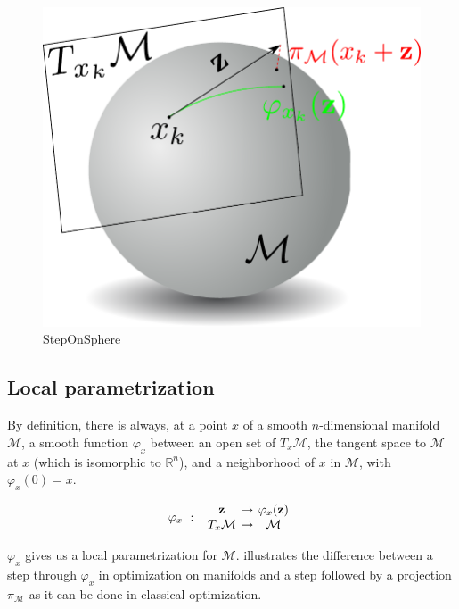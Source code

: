 \begin{figure}[htpb]
  \centering
  \includegraphics[width=0.5\linewidth]{Humanoids2015/stepOnSphere.pdf}
  \caption{StepOnSphere}
\label{fig:stepOnSphere}
\end{figure}


\subsection{Local parametrization}
By definition, there is always, at a point $x$ of a smooth $n$-dimensional manifold $\mathcal{M}$, a smooth function $\varphi_x$ between an open set of $T_x\mathcal{M}$, the tangent space to $\mathcal{M}$ at $x$ (which is isomorphic to $\mathbb{R}^n$), and a neighborhood of $x$ in $\mathcal{M}$, with $\varphi_x(0) = x$.

\begin{equation}
  \varphi_x\ :\
  \begin{array}{ccc}
    \mathbf{z} & \reduce{\mapsto}{6} & \varphi_x(\mathbf{z}) \\
    T_x\mathcal{M} & \reduce{\rightarrow}{6} & \mathcal{M}
  \end{array} \nonumber%
\end{equation}

$\varphi_x$ gives us a local parametrization for $\mathcal{M}$.
 illustrates the difference between a step through $\varphi_x$ in optimization on manifolds and a step followed by a projection $\pi_\mathcal{M}$ as it can be done in classical optimization.

